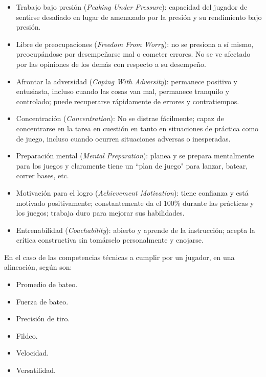 \begin{itemize}
	\item Trabajo bajo presión (\textit{Peaking Under Pressure}): capacidad del jugador de sentirse desafiado en lugar de amenazado por la presión y su rendimiento bajo presión.
	
	\item Libre de preocupaciones (\textit{Freedom From Worry}): no se presiona a sí mismo, preocupándose por desempeñarse mal o cometer errores. No se ve afectado por las opiniones de los demás con respecto a su desempeño.
	
	\item Afrontar la adversidad (\textit{Coping With Adversity}): permanece positivo y entusiasta, incluso cuando las cosas van mal, permanece tranquilo y controlado; puede recuperarse rápidamente de errores y contratiempos.
	
	\item Concentración (\textit{Concentration}): No se distrae fácilmente; capaz de concentrarse en la tarea en cuestión en tanto en situaciones de práctica como de juego, incluso cuando ocurren situaciones adversas o inesperadas.
	
	\item Preparación mental (\textit{Mental Preparation}): planea y se prepara mentalmente para los juegos y claramente tiene un “plan de juego" para lanzar, batear, correr bases, etc.
	
	\item Motivación para el logro (\textit{Achievement Motivation}): tiene confianza y está motivado positivamente; constantemente da el 100\% durante las prácticas y los juegos; trabaja duro para mejorar sus habilidades.
	
	\item Entrenabilidad (\textit{Coachability}): abierto y aprende de la instrucción; acepta la crítica constructiva sin tomárselo personalmente y enojarse.
\end{itemize}

En el caso de las competencias técnicas a cumplir por un jugador, en una alineación, según \cite{2020a, Silverman2011} son:
\begin{itemize}
	\item Promedio de bateo.
	\item Fuerza de bateo.
	\item Precisión de tiro. 
	\item Fildeo.
	\item Velocidad.
	\item Versatilidad.
\end{itemize}

